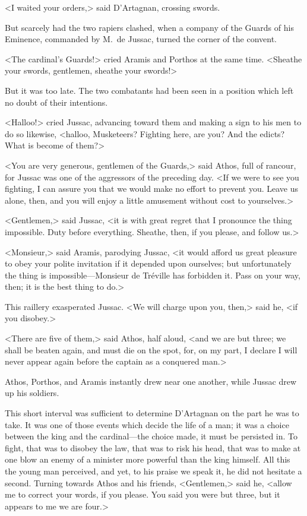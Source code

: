 <I waited your orders,> said D'Artagnan, crossing swords. 

But scarcely had the two rapiers clashed, when a company of the Guards of his Eminence, commanded by M.~de Jussac, turned the corner of the convent. 

<The cardinal's Guards!> cried Aramis and Porthos at the same time. <Sheathe your swords, gentlemen, sheathe your swords!> 

But it was too late. The two combatants had been seen in a position which left no doubt of their intentions. 

<Halloo!> cried Jussac, advancing toward them and making a sign to his men to do so likewise, <halloo, Musketeers? Fighting here, are you? And the edicts? What is become of them?> 

<You are very generous, gentlemen of the Guards,> said Athos, full of rancour, for Jussac was one of the aggressors of the preceding day. <If we were to see you fighting, I can assure you that we would make no effort to prevent you. Leave us alone, then, and you will enjoy a little amusement without cost to yourselves.> 

<Gentlemen,> said Jussac, <it is with great regret that I pronounce the thing impossible. Duty before everything. Sheathe, then, if you please, and follow us.> 

<Monsieur,> said Aramis, parodying Jussac, <it would afford us great pleasure to obey your polite invitation if it depended upon ourselves; but unfortunately the thing is impossible—Monsieur de Tréville has forbidden it. Pass on your way, then; it is the best thing to do.> 

This raillery exasperated Jussac. <We will charge upon you, then,> said he, <if you disobey.> 

<There are five of them,> said Athos, half aloud, <and we are but three; we shall be beaten again, and must die on the spot, for, on my part, I declare I will never appear again before the captain as a conquered man.> 

Athos, Porthos, and Aramis instantly drew near one another, while Jussac drew up his soldiers. 

This short interval was sufficient to determine D'Artagnan on the part he was to take. It was one of those events which decide the life of a man; it was a choice between the king and the cardinal—the choice made, it must be persisted in. To fight, that was to disobey the law, that was to risk his head, that was to make at one blow an enemy of a minister more powerful than the king himself. All this the young man perceived, and yet, to his praise we speak it, he did not hesitate a second. Turning towards Athos and his friends, <Gentlemen,> said he, <allow me to correct your words, if you please. You said you were but three, but it appears to me we are four.> 

